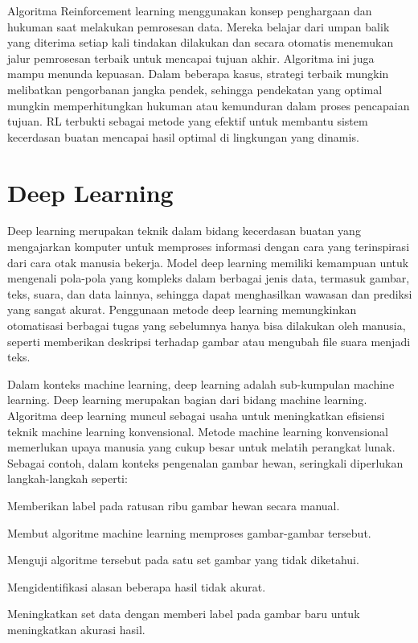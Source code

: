 Algoritma Reinforcement learning menggunakan konsep penghargaan dan hukuman saat melakukan pemrosesan data. Mereka belajar dari umpan balik yang diterima setiap kali tindakan dilakukan dan secara otomatis menemukan jalur pemrosesan terbaik untuk mencapai tujuan akhir. Algoritma ini juga mampu menunda kepuasan. Dalam beberapa kasus, strategi terbaik mungkin melibatkan pengorbanan jangka pendek, sehingga pendekatan yang optimal mungkin memperhitungkan hukuman atau kemunduran dalam proses pencapaian tujuan. RL terbukti sebagai metode yang efektif untuk membantu sistem kecerdasan buatan mencapai hasil optimal di lingkungan yang dinamis.

\section{Deep Learning}
Deep learning merupakan teknik dalam bidang kecerdasan buatan yang mengajarkan komputer untuk memproses informasi dengan cara yang terinspirasi dari cara otak manusia bekerja. Model deep learning memiliki kemampuan untuk mengenali pola-pola yang kompleks dalam berbagai jenis data, termasuk gambar, teks, suara, dan data lainnya, sehingga dapat menghasilkan wawasan dan prediksi yang sangat akurat. Penggunaan metode deep learning memungkinkan otomatisasi berbagai tugas yang sebelumnya hanya bisa dilakukan oleh manusia, seperti memberikan deskripsi terhadap gambar atau mengubah file suara menjadi teks.

Dalam konteks machine learning, deep learning adalah sub-kumpulan machine learning. Deep learning merupakan bagian dari bidang machine learning. Algoritma deep learning muncul sebagai usaha untuk meningkatkan efisiensi teknik machine learning konvensional. Metode machine learning konvensional memerlukan upaya manusia yang cukup besar untuk melatih perangkat lunak. Sebagai contoh, dalam konteks pengenalan gambar hewan, seringkali diperlukan langkah-langkah seperti:

\begin{packed_item}
	\item Memberikan label pada ratusan ribu gambar hewan secara manual.
	\item Membut algoritme machine learning memproses gambar-gambar tersebut.
	\item Menguji algoritme tersebut pada satu set gambar yang tidak diketahui.
	\item Mengidentifikasi alasan beberapa hasil tidak akurat.
	\item Meningkatkan set data dengan memberi label pada gambar baru untuk meningkatkan akurasi hasil.
\end{packed_item}	

